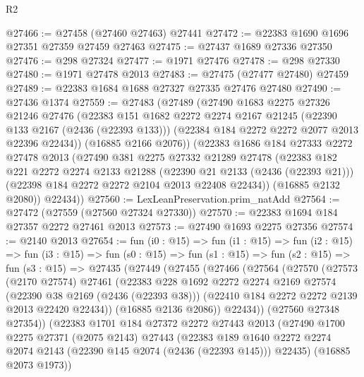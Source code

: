 \begin{lexlean}{R2}
\begin{coremodule}
@27466 := @27458 (@27460 @27463) @27441
@27472 := @22383 @1690 @1696 @27351 @27359 @27459 @27463
@27475 := @27437 @1689 @27336 @27350
@27476 := @298 @27324
@27477 := @1971 @27476
@27478 := @298 @27330
@27480 := @1971 @27478 @2013
@27483 := @27475 (@27477 @27480) @27459
@27489 := @22383 @1684 @1688 @27327 @27335 @27476 @27480
@27490 := @27436 @1374
@27559 := @27483
    (@27489
      (@27490
        @1683
        @2275
        @27326
        @21246
        @27476
        (@22383
          @151
          @1682
          @2272
          @2274
          @2167
          @21245
          (@22390 @133 @2167 (@2436 (@22393 @133)))
          (@22384 @184 @2272 @2272 @2077 @2013 @22396 @22434))
        (@16885 @2166 @2076))
      (@22383
        @1686
        @184
        @27333
        @2272
        @27478
        @2013
        (@27490
          @381
          @2275
          @27332
          @21289
          @27478
          (@22383
            @182
            @221
            @2272
            @2274
            @2133
            @21288
            (@22390 @21 @2133 (@2436 (@22393 @21)))
            (@22398 @184 @2272 @2272 @2104 @2013 @22408 @22434))
          (@16885 @2132 @2080))
        @22434))
@27560 := LexLeanPreservation.prim_natAdd
@27564 := @27472 (@27559 (@27560 @27324 @27330))
@27570 := @22383 @1694 @184 @27357 @2272 @27461 @2013
@27573 := @27490 @1693 @2275 @27356
@27574 := @2140 @2013
@27654 := fun (i0 : @15) =>
  fun (i1 : @15) =>
  fun (i2 : @15) =>
  fun (i3 : @15) =>
  fun (s0 : @15) =>
  fun (s1 : @15) =>
  fun (s2 : @15) =>
  fun (s3 : @15) =>
  @27435
    (@27449
      (@27455
        (@27466
          (@27564
            (@27570
              (@27573
                (@2170 @27574)
                @27461
                (@22383
                  @228
                  @1692
                  @2272
                  @2274
                  @2169
                  @27574
                  (@22390 @38 @2169 (@2436 (@22393 @38)))
                  (@22410 @184 @2272 @2272 @2139 @2013 @22420 @22434))
                (@16885 @2136 @2086))
              @22434))
          (@27560 @27348 @27354))
        (@22383
          @1701
          @184
          @27372
          @2272
          @27443
          @2013
          (@27490
            @1700
            @2275
            @27371
            (@2075 @2143)
            @27443
            (@22383
              @189
              @1640
              @2272
              @2274
              @2074
              @2143
              (@22390 @145 @2074 (@2436 (@22393 @145)))
              @22435)
            (@16885 @2073 @1973))

\end{coremodule}
\end{lexlean}
